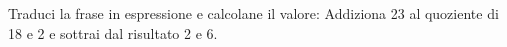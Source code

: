 \item Traduci la frase in espressione e calcolane il valore: Addiziona 23 al quoziente di 18 e 2 e sottrai dal risultato 2 e 6.